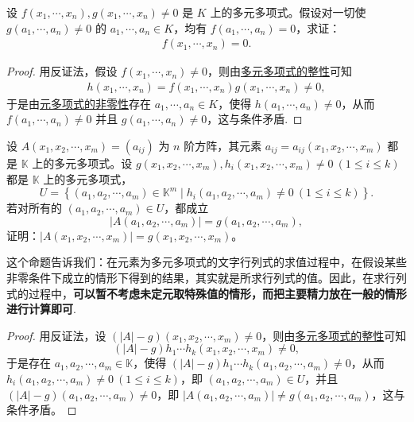 \documentclass[../../main.tex]{subfiles}%
\begin{document}
\begin{example}
设 \(f(x_1,\cdots ,x_n), g(x_1,\cdots ,x_n) \ne 0\) 是 \(K\) 上的多元多项式。假设对一切使 \(g(a_1,\cdots ,a_n) \ne 0\) 的 \(a_1,\cdots ,a_n \in K\)，均有 \(f(a_1,\cdots ,a_n) = 0\)，求证：
\begin{align*}
f(x_1,\cdots ,x_n) = 0.
\end{align*}
\end{example}
\begin{proof}

用反证法，假设 \(f(x_1,\cdots ,x_n) \ne 0\)，则由\hyperref[proposition:多元多项式的整性]{多元多项式的整性}可知
\begin{align*}
h(x_1,\cdots ,x_n) = f(x_1,\cdots ,x_n) g(x_1,\cdots ,x_n) \ne 0,
\end{align*}
于是由\hyperref[lemma:多元多项式的非零性]{元多项式的非零性}存在 \(a_1,\cdots ,a_n \in K\)，使得 \(h(a_1,\cdots ,a_n) \ne 0\)，从而\(f(a_1,\cdots ,a_n) \ne 0\) 并且 \(g(a_1,\cdots ,a_n) \ne 0\)，这与条件矛盾.

\end{proof}

\begin{proposition}
设 $A(x_1, x_2, \cdots, x_m) = (a_{ij})$ 为 $n$ 阶方阵，其元素 $a_{ij} = a_{ij}(x_1, x_2, \cdots, x_m)$ 都是 $\mathbb{K}$ 上的多元多项式。设 $g(x_1, x_2, \cdots, x_m), h_i(x_1, x_2, \cdots, x_m) \neq 0 \ (1 \leqslant  i \leqslant  k)$都是 $\mathbb{K}$ 上的多元多项式，
\[
U = \left\{ (a_1, a_2, \cdots, a_m) \in \mathbb{K}^m \mid h_i(a_1, a_2, \cdots, a_m) \neq 0 \ (1 \leqslant  i \leqslant  k) \right\}.
\]
若对所有的 $(a_1, a_2, \cdots, a_m) \in U$，都成立
\[
|A(a_1, a_2, \cdots, a_m)| = g(a_1, a_2, \cdots, a_m),
\]
证明：$|A(x_1, x_2, \cdots, x_m)| = g(x_1, x_2, \cdots, x_m)$。
\end{proposition}
\begin{note}
这个命题告诉我们：在元素为多元多项式的文字行列式的求值过程中，在假设某些非零条件下成立的情形下得到的结果，其实就是所求行列式的值。因此，在求行列式的过程中，\textbf{可以暂不考虑未定元取特殊值的情形，而把主要精力放在一般的情形进行计算即可}.
\end{note}
\begin{proof}

用反证法，设 $(|A| - g)(x_1, x_2, \cdots, x_m) \neq 0$，则由\hyperref[lemma:多元多项式的整性]{多元多项式的整性}可知
\[
(|A| - g)h_1 \cdots h_k (x_1, x_2, \cdots, x_m) \neq 0,
\]
于是存在 $a_1, a_2, \cdots, a_m \in \mathbb{K}$，使得 $(|A| - g)h_1 \cdots h_k (a_1, a_2, \cdots, a_m) \neq 0$，从而 $h_i(a_1, a_2, \cdots, a_m) \neq 0 \ (1 \leqslant  i \leqslant  k)$，即 $(a_1, a_2, \cdots, a_m) \in U$，并且 $(|A| - g)(a_1, a_2, \cdots, a_m) \neq 0$，即 $|A(a_1, a_2, \cdots, a_m)| \neq g(a_1, a_2, \cdots, a_m)$，这与条件矛盾。

\end{proof}
\end{document}
